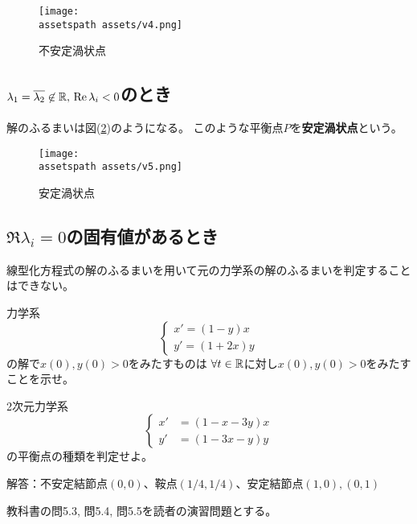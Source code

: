 \documentclass[report]{jlreq}
\def\assetspath{../}
\begin{document}
\begin{figure}[H]
    \centering
    \texttt{[image: \\assetspath assets/v4.png]}
    \caption{不安定渦状点}
    \label{5:fig:4}
\end{figure}

\subsection{
    \texorpdfstring{%
        $\lambda_1 = \overline{\lambda_2} \not\in \mathbb{R},\, \operatorname{\mathrm{Re}} \lambda_i < 0$のとき%
    }{%
    }%
}

解のふるまいは図(\ref{5:fig:5})のようになる。
このような平衡点$P$を\textbf{安定渦状点}という。

\begin{figure}[H]
    \centering
    \texttt{[image: \\assetspath assets/v5.png]}
    \caption{安定渦状点}
    \label{5:fig:5}
\end{figure}

\subsection{$\Re\lambda_i = 0$の固有値があるとき}

線型化方程式の解のふるまいを用いて元の力学系の解のふるまいを判定することはできない。


\begin{problem}
    力学系
    \begin{equation}
        \begin{cases}
            x' = (1 - y) x \\
            y' = (1 + 2x) y
        \end{cases}
    \end{equation}
    の解で$x(0), y(0) > 0$をみたすものは
    $\forall t \in \mathbb{R}$に対し$x(0), y(0) > 0$をみたすことを示せ。
\end{problem}

\begin{problem}
    2次元力学系
    \begin{equation}
        \begin{cases}
            x' &= (1 - x - 3y) x \\
            y' &= (1 - 3x - y) y
        \end{cases}
    \end{equation}
    の平衡点の種類を判定せよ。

    解答：不安定結節点$(0, 0)$、鞍点$(1/4, 1/4)$、安定結節点$(1, 0), (0, 1)$
\end{problem}

\begin{problem}
    教科書の問5.3, 問5.4, 問5.5を読者の演習問題とする。
\end{problem}
\end{document}
